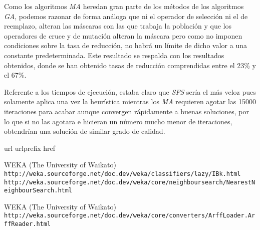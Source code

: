 \documentclass[a4paper, 11pt]{article}
\begin{document}
			Como los algoritmos \textit{MA} heredan gran parte de los métodos de los algoritmos \textit{GA},
			podemos razonar de forma análoga que ni el operador de selección ni el de reemplazo, alteran
			las máscaras con las que trabaja la población y que los operadores de cruce y de mutación
			alteran la máscara pero como no imponen condiciones sobre la tasa de reducción, no habrá
			un límite de dicho valor a una constante predeterminada. Este resultado se respalda con los
			resultados obtenidos, donde se han obtenido tasas de reducción comprendidas entre el 23\% y
			el 67\%.
			
			Referente a los tiempos de ejecución, estaba claro que \textit{SFS} sería el más veloz pues
			solamente aplica una vez la heurística mientras los \textit{MA} requieren agotar las 15000
			iteraciones para acabar aunque convergen rápidamente a buenas soluciones, por lo que si no
			las agotara e hicieran un número mucho menor de iteraciones, obtendrían una solución de
			similar grado de calidad.
			
	
	\newpage
	
	\begin{thebibliography}{10}
	\expandafter\ifx\csname url\endcsname\relax
	  \def\url#1{\texttt{#1}}\fi
	\expandafter\ifx\csname urlprefix\endcsname\relax\def\urlprefix{URL }\fi
	\expandafter\ifx\csname href\endcsname\relax
	  \def\href#1#2{#2} \def\path#1{#1}\fi
	
	WEKA (The University of Waikato)\\
	  \url{http://weka.sourceforge.net/doc.dev/weka/classifiers/lazy/IBk.html}\\
	  \url{http://weka.sourceforge.net/doc.dev/weka/core/neighboursearch/NearestNeighbourSearch.html}
	  
  	WEKA (The University of Waikato)\\
	  \url{http://weka.sourceforge.net/doc.dev/weka/core/converters/ArffLoader.ArffReader.html}
	  
	\end{thebibliography}
\end{document}
